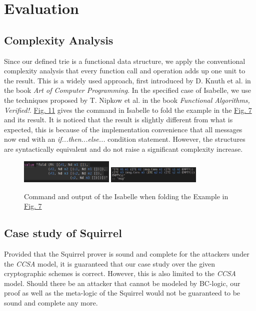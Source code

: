 \documentclass[conference]{IEEEtran}
\begin{document}
\section{Evaluation}
\subsection{Complexity Analysis}
Since our defined trie is a functional data structure, we apply the conventional complexity analysis that every function call and operation adds up one unit to the result. This is a widely used approach, first introduced by D. Knuth et al. in the book \textit{Art of Computer Programming}.\cite{ART} In the specified case of Isabelle, we use the techniques proposed by T. Nipkow et al. in the book \textit{Functional Algorithms, Verified!}. \cite{FAV} \hyperref[figure:11]{Fig. 11} gives the command in Isabelle to fold the example in the \hyperref[figure:7]{Fig. 7} and its result. It is noticed that the result is slightly different from what is expected, this is because of the implementation convenience that all messages now end with an \textit{if...then...else...} condition statement. However, the structures are syntactically equivalent and do not raise a significant complexity increase.
\begin{figure}
\centering
   \includegraphics[width=0.4\textwidth]{Isabelle_command.png}
   \includegraphics[width=0.4\textwidth]{Isabelle_output.png}
\caption{Command and output of the Isabelle when folding the Example in \hyperref[figure:11]{Fig. 7}}
\label{figure:11}
\end{figure}
\subsection{Case study of Squirrel}
Provided that the Squirrel prover is sound and complete for the attackers under the \textit{CCSA} model, it is guaranteed that our case study over the given cryptographic schemes is correct. However, this is also limited to the \textit{CCSA} model. Should there be an attacker that cannot be modeled by BC-logic, our proof as well as the meta-logic of the Squirrel would not be guaranteed to be sound and complete any more.
\end{document}
